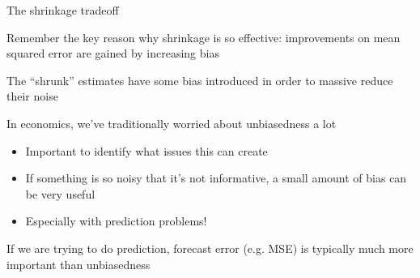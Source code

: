 \documentclass[notes,11pt, aspectratio=169]{beamer}
\newenvironment{wideitemize}{\itemize\addtolength{\itemsep}{10pt}}{\enditemize}
\begin{document}
\begin{frame}{The shrinkage tradeoff}
  \begin{wideitemize}
  \item Remember the key reason why shrinkage is so effective:
    improvements on mean squared error are gained by increasing bias
  \item The ``shrunk'' estimates have some bias introduced in order to
    massive reduce their noise
  \item In economics, we've traditionally worried about unbiasedness a
    lot
    \begin{itemize}
    \item Important to identify what issues this can create
    \item If something is so noisy that it's not informative, a small
      amount of bias can be very useful
    \item Especially with prediction problems!
    \end{itemize}
  \item If we are trying to do prediction, forecast error (e.g. MSE)
    is typically much more important than unbiasedness
  \end{wideitemize}
\end{frame}
\end{document}
